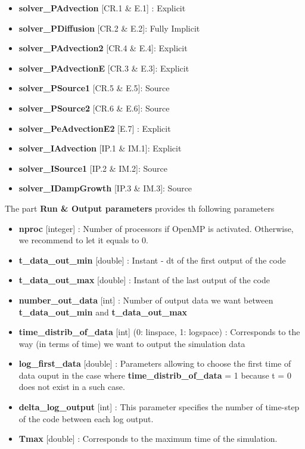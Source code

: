        \begin{itemize}
            \item {\bf{solver\_PAdvection}} [CR.1 \& E.1] : Explicit
            \item {\bf{solver\_PDiffusion}} [CR.2 \& E.2]: Fully Implicit
            \item {\bf{solver\_PAdvection2}} [CR.4 \& E.4]: Explicit 
            \item {\bf{solver\_PAdvectionE}} [CR.3 \& E.3]: Explicit 
            \item {\bf{solver\_PSource1}} [CR.5 \& E.5]: Source 
            \item {\bf{solver\_PSource2}} [CR.6 \& E.6]: Source
            \item {\bf{solver\_PeAdvectionE2}} [E.7] : Explicit 
            \item {\bf{solver\_IAdvection}} [IP.1 \& IM.1]: Explicit 
            \item {\bf{solver\_ISource1}}  [IP.2 \& IM.2]: Source 
            \item {\bf{solver\_IDampGrowth}} [IP.3 \& IM.3]: Source 
        \end{itemize}

        \noi The part {\bf{Run \& Output parameters}} provides th following parameters 

        \begin{itemize}
            \item {\bf{nproc}} [integer] : Number of processors if OpenMP is activated. Otherwise, we recommend to let it equals to 0. 
            \item {\bf{t\_data\_out\_min}} [double] : Instant - dt of the first output of the code 
            \item {\bf{t\_data\_out\_max}} [double] : Instant of the last output of the code
            \item {\bf{number\_out\_data}} [int] : Number of output data we want between {\bf{t\_data\_out\_min}} and {\bf{t\_data\_out\_max}}
            \item {\bf{time\_distrib\_of\_data}} [int] (0: linspace, 1: logspace) : Corresponds to the way (in terms of time) we want to output the simulation data
            \item {\bf{log\_first\_data}} [double] : Parameters allowing to choose the first time of data ouput in the case where {\bf{time\_distrib\_of\_data}} = 1 because t = 0
                                                    does not exist in a such case. 
            \item {\bf{delta\_log\_output}} [int] : This parameter specifies the number of time-step of the code between each log output. 
            \item {\bf{Tmax}} [double] : Corresponds to the maximum time of the simulation. 
        \end{itemize}

